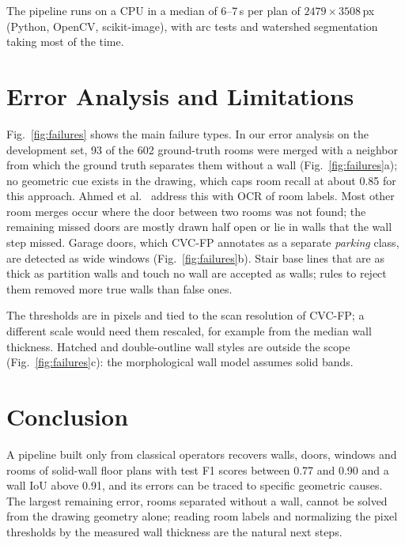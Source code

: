 \documentclass[conference]{IEEEtran}
\begin{document}
The pipeline runs on a CPU in a median of 6--7\,s per plan of
$2479\times3508$\,px (Python, OpenCV, scikit-image), with arc tests and
watershed segmentation taking most of the time.

\section{Error Analysis and Limitations}

Fig.~\ref{fig:failures} shows the main failure types. In our error analysis
on the development set, 93 of the 602 ground-truth rooms were merged with a
neighbor from which the ground truth separates them without a wall
(Fig.~\ref{fig:failures}a); no geometric
cue exists in the drawing, which caps room recall at about 0.85 for this
approach. Ahmed et al.~\cite{ahmed2012rooms} address this with OCR of room
labels. Most other room merges occur where the door between two rooms was
not found; the remaining missed doors are mostly drawn half open or lie in
walls that the wall step missed. Garage doors, which CVC-FP annotates as a
separate \emph{parking} class, are detected as wide windows
(Fig.~\ref{fig:failures}b). Stair base lines that are as thick as partition
walls and touch no wall are accepted as walls; rules to reject them removed
more true walls than false ones.

The thresholds are in pixels and tied to the scan resolution of CVC-FP; a
different scale would need them rescaled, for example from the median wall
thickness. Hatched and double-outline wall styles are outside the scope
(Fig.~\ref{fig:failures}c): the morphological wall model assumes solid
bands.

\section{Conclusion}

A pipeline built only from classical operators recovers walls, doors,
windows and rooms of solid-wall floor plans with test F1 scores between
0.77 and 0.90 and a wall IoU above 0.91, and its errors can be traced to
specific geometric causes. The largest remaining error, rooms separated
without a wall, cannot be solved from the drawing geometry alone; reading
room labels and normalizing the pixel thresholds by the measured wall
thickness are the natural next steps.



\end{document}
